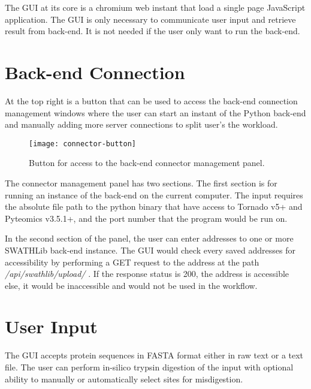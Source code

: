\documentclass[../manual.tex]{subfiles}
\begin{document}
The GUI at its core is a chromium web instant that load a single page JavaScript application. The GUI is only necessary to communicate user input and retrieve result from back-end. It is not needed if the user only want to run the back-end.\par

\section{Back-end Connection}
At the top right is a button that can be used to access the back-end connection management windows where the user can start an instant of the Python back-end and manually adding more server connections to split user's the workload.\par

\begin{figure}[h]
	\centering
	\begin{framed}
		\centering
		\texttt{[image: connector-button]}
		\caption{Button for access to the back-end connector management panel.}\label{fig:connectorbutton}
	\end{framed}
\end{figure}

The connector management panel has two sections. The first section is for running an instance of the back-end on the current computer. The input requires the absolute file path to the python binary that have access to Tornado v5+ and Pyteomics v3.5.1+, and the port number that the program would be run on.\par

In the second section of the panel, the user can enter addresses to one or more SWATHLib back-end instance. The GUI would check every saved addresses for accessibility by performing a GET request to the address at the path \emph{/api/swathlib/upload/} . If the response status is 200, the address is accessible else, it would be inaccessible and would not be used in the workflow.\par 

\section{User Input}
The GUI accepts protein sequences in FASTA format either in raw text or a text file. The user can perform in-silico trypsin digestion of the input with optional ability to manually or automatically select sites for misdigestion.\par
\end{document}
